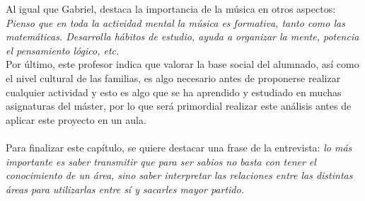 \documentclass[a4paper, openright, 11pt, titlepage]{report}
\theoremstyle{definition}\newtheorem{defin}[propo]{Definition}
\theoremstyle{definition}\newtheorem{obser}[propo]{Remark}
\theoremstyle{definition}\newtheorem{ejem}[propo]{Ejemplo}
\theoremstyle{definition}\newtheorem{algoritmo}[propo]{Algoritmo}
\begin{document}
Al igual que Gabriel, destaca la importancia de la música en otros aspectos: \textit{Pienso  que  en  toda  la  actividad  mental  la  música  es  formativa,  tanto  como  las matemáticas.  Desarrolla  hábitos  de  estudio,  ayuda  a  organizar  la  mente,  potencia  el pensamiento  lógico,  etc.}\\
Por último, este profesor indica que valorar la base social del alumnado, así como el nivel cultural de las familias, es algo necesario antes de proponerse realizar cualquier actividad y esto es algo que se ha aprendido y estudiado en muchas asignaturas del máster, por lo que será primordial realizar este análisis antes de aplicar este proyecto en un aula.\\\\
Para finalizar este capítulo, se quiere destacar una frase de la entrevista: \textit{lo  más  importante  es  saber  transmitir  que  para  ser  sabios  no  basta  con tener  el  conocimiento  de  un  área,  sino  saber  interpretar  las  relaciones  entre  las  distintas áreas para utilizarlas entre sí y sacarles mayor partido.}
\end{document}
